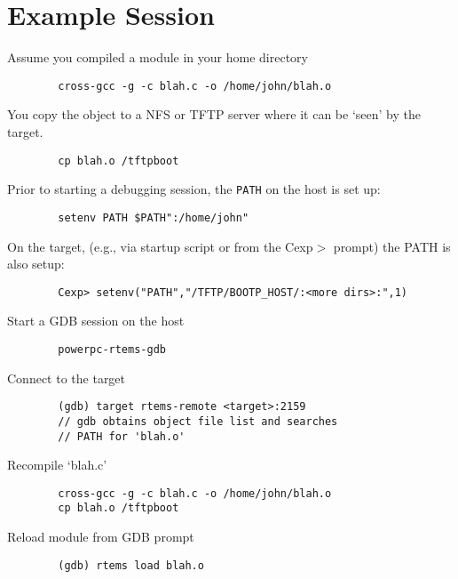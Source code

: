 \documentclass{article}
\begin{document}
\section{Example Session}
	Assume you compiled a module in your home directory
\begin{verbatim}
		cross-gcc -g -c blah.c -o /home/john/blah.o
\end{verbatim}
    You copy the object to a NFS or TFTP server where it can be
	`seen' by the target.
\begin{verbatim}
		cp blah.o /tftpboot
\end{verbatim}
	Prior to starting a debugging session, the {\tt PATH} on the
	host is set up:
\begin{verbatim}
		setenv PATH $PATH":/home/john"
\end{verbatim}
	On the target, (e.g., via startup script or from the Cexp$>$
	prompt) the PATH is also setup:
\begin{verbatim}
		Cexp> setenv("PATH","/TFTP/BOOTP_HOST/:<more dirs>:",1)
\end{verbatim}
	Start a GDB session on the host
\begin{verbatim}
		powerpc-rtems-gdb
\end{verbatim}
	Connect to the target
\begin{verbatim}
		(gdb) target rtems-remote <target>:2159
		// gdb obtains object file list and searches
		// PATH for 'blah.o'
\end{verbatim}
	Recompile `blah.c'
\begin{verbatim}
		cross-gcc -g -c blah.c -o /home/john/blah.o
		cp blah.o /tftpboot
\end{verbatim}
	Reload module from GDB prompt
\begin{verbatim}
		(gdb) rtems load blah.o
\end{verbatim}
\end{document}
